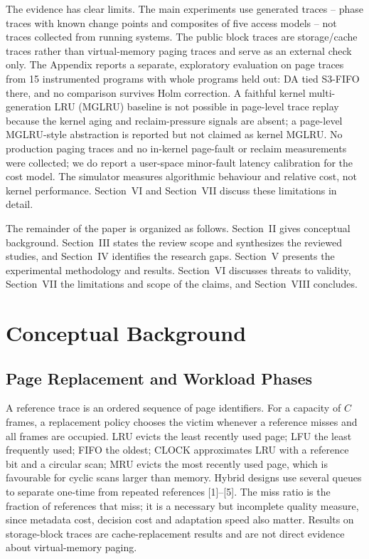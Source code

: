 \documentclass[10pt,twocolumn,a4paper]{IEEEtran}
\begin{document}
The evidence has clear limits. The main experiments use generated traces --
phase traces with known change points and composites of five access models --
not traces collected from running systems. The public block traces are
storage/cache traces rather than virtual-memory paging traces and serve as an
external check only. The Appendix reports a separate, exploratory evaluation
on page traces from 15 instrumented programs with whole programs held out: DA
tied S3-FIFO there, and no comparison survives Holm correction. A faithful
kernel multi-generation LRU (MGLRU) baseline is not possible in page-level
trace replay because the kernel aging and reclaim-pressure signals are absent;
a page-level MGLRU-style abstraction is reported but not claimed as kernel
MGLRU. No production paging traces and no in-kernel page-fault or reclaim
measurements were collected; we do report a user-space minor-fault latency
calibration for the cost model. The simulator measures algorithmic behaviour
and relative cost, not kernel performance. Section~VI and Section~VII discuss
these limitations in detail.

The remainder of the paper is organized as follows. Section~II gives
conceptual background. Section~III states the review scope and synthesizes the
reviewed studies, and Section~IV identifies the research gaps. Section~V
presents the experimental methodology and results. Section~VI discusses
threats to validity, Section~VII the limitations and scope of the claims, and
Section~VIII concludes.

\section{Conceptual Background}
\label{sec:background}

\subsection{Page Replacement and Workload Phases}

A reference trace is an ordered sequence of page identifiers. For a capacity of
$C$ frames, a replacement policy chooses the victim whenever a reference misses
and all frames are occupied. LRU evicts the least recently used page; LFU the
least frequently used; FIFO the oldest; CLOCK approximates LRU with a reference
bit and a circular scan; MRU evicts the most recently used page, which is
favourable for cyclic scans larger than memory. Hybrid designs use several
queues to separate one-time from repeated references [1]--[5]. The miss ratio
is the fraction of references that miss; it is a necessary but incomplete
quality measure, since metadata cost, decision cost and adaptation speed also
matter. Results on storage-block traces are cache-replacement results and are
not direct evidence about virtual-memory paging.
\end{document}
